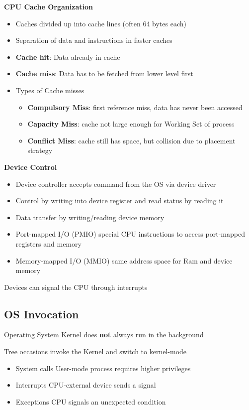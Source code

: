 \documentclass[11pt,a4paper]{article}
\begin{document}
	\textbf{CPU Cache Organization}
	\begin{itemize}
		\item Caches divided up into cache lines (often 64 bytes each)
		\item Separation of data and instructions in faster caches
		\item \textbf{Cache hit}: Data already in cache
		\item \textbf{Cache miss}: Data has to be fetched from lower level first
		\item Types of Cache misses
		\begin{itemize}
			\item \textbf{Compulsory Miss}: first reference miss, data has never been accessed
			\item \textbf{Capacity Miss}: cache not large enough for Working Set of process
			\item \textbf{Conflict Miss}: cache still has space, but collision due to placement strategy
		\end{itemize}
	\end{itemize}

	\textbf{Device Control}
	
	\begin{itemize}
		\item Device controller accepts command from the OS via device driver
		\item Control by writing into device register and read status by reading it
		\item Data transfer by writing/reading device memory
		\item Port-mapped I/O (PMIO) special CPU instructions to access port-mapped registers and memory
		\item Memory-mapped I/O (MMIO) same address space for Ram and device memory
	\end{itemize}

	\hspace{5mm}Devices can signal the CPU through interrupts
	
	\subsection{OS Invocation}
	
	Operating System Kernel does \textbf{not} always run in the background
	
	Tree occasions invoke the Kernel and switch to kernel-mode
	\begin{itemize}
		\item System calls		\tab User-mode process requires higher privileges
		\item Interrupts		\tab CPU-external device sends a signal
		\item Exceptions		\tab CPU signals an unexpected condition
	\end{itemize}
	
\end{document}
